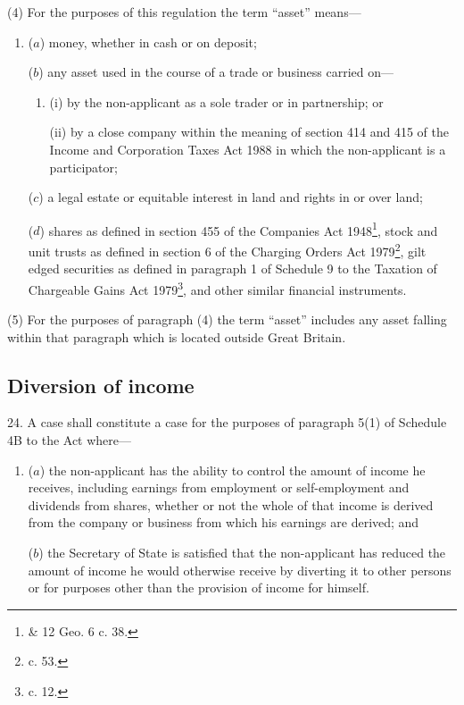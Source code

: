 \documentclass[a4paper]{article}
\begin{document}
(4) For the purposes of this regulation the term “asset” means—
\begin{enumerate}\item[]
($a$) money, whether in cash or on deposit;

($b$) any asset used in the course of a trade or business carried on—
\begin{enumerate}\item[]
(i) by the non-applicant as a sole trader or in partnership; or

(ii) by a close company within the meaning of section 414 and 415 of the Income and Corporation Taxes Act 1988 in which the non-applicant is a participator;
\end{enumerate}

($c$) a legal estate or equitable interest in land and rights in or over land;

($d$) shares as defined in section 455 of the Companies Act 1948\footnote{ \& 12 Geo. 6 c. 38.}, stock and unit trusts as defined in section 6 of the Charging Orders Act 1979\footnote{ c. 53.}, gilt edged securities as defined in paragraph 1 of Schedule 9 to the Taxation of Chargeable Gains Act 1979\footnote{ c. 12.}, and other similar financial instruments.
\end{enumerate}

(5) For the purposes of paragraph (4) the term “asset” includes any asset falling within that paragraph which is located outside Great Britain.

\subsection[24. Diversion of income]{Diversion of income}

24.  A case shall constitute a case for the purposes of paragraph 5(1) of Schedule 4B to the Act where—
\begin{enumerate}\item[]
($a$) the non-applicant has the ability to control the amount of income he receives, including earnings from employment or self-employment and dividends from shares, whether or not the whole of that income is derived from the company or business from which his earnings are derived; and

($b$) the Secretary of State is satisfied that the non-applicant has reduced the amount of income he would otherwise receive by diverting it to other persons or for purposes other than the provision of income for himself.
\end{enumerate}
\end{document}
